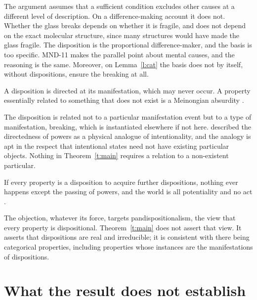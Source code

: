 \documentclass{situationist-preprint}
\begin{document}
\begin{reply}
The argument assumes that a sufficient condition excludes other causes at a different level of description. On a difference-making account it does not. Whether the glass breaks depends on whether it is fragile, and does not depend on the exact molecular structure, since many structures would have made the glass fragile. The disposition is the proportional difference-maker, and the basis is too specific. MND-11 makes the parallel point about mental causes, and the reasoning is the same. Moreover, on Lemma~\ref{l:cat} the basis does not by itself, without dispositions, ensure the breaking at all.
\end{reply}

\begin{objection}
A disposition is directed at its manifestation, which may never occur. A property essentially related to something that does not exist is a Meinongian absurdity \citep{Armstrong1997}.
\end{objection}

\begin{reply}
The disposition is related not to a particular manifestation event but to a type of manifestation, breaking, which is instantiated elsewhere if not here. \citet{Molnar2003} described the directedness of powers as a physical analogue of intentionality, and the analogy is apt in the respect that intentional states need not have existing particular objects. Nothing in Theorem~\ref{t:main} requires a relation to a non-existent particular.
\end{reply}

\begin{objection}[Regress]
If every property is a disposition to acquire further dispositions, nothing ever happens except the passing of powers, and the world is all potentiality and no act \citep{Armstrong1997}.
\end{objection}

\begin{reply}
The objection, whatever its force, targets pandispositionalism, the view that every property is dispositional. Theorem~\ref{t:main} does not assert that view. It asserts that dispositions are real and irreducible; it is consistent with there being categorical properties, including properties whose instances are the manifestations of dispositions.
\end{reply}

\section{What the result does not establish}\label{s:limits}
\end{document}
